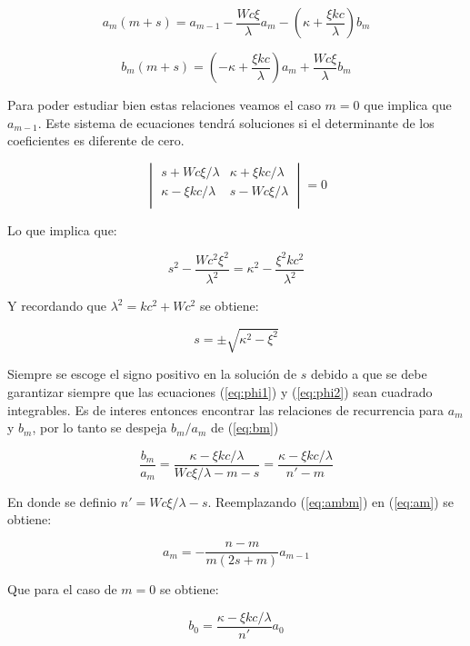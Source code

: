 \documentclass[a4paper, 12pt]{article} %
\begin{document}
\begin{equation}\label{eq:am}
a_m(m+s) = a_{m-1} - \dfrac{Wc\xi}{\lambda}a_m - \left(\kappa + \dfrac{\xi kc}{\lambda}\right) b_m
\end{equation}

\begin{equation}\label{eq:bm}
b_m(m+s) = \left( -\kappa + \dfrac{\xi kc}{\lambda}  \right)a_m + \dfrac{Wc \xi}{\lambda}b_m
\end{equation}

Para poder estudiar bien estas relaciones veamos el caso $m=0$ que implica que $a_{m-1}$. Este 
sistema de ecuaciones tendr\'a soluciones si el determinante de los coeficientes es diferente de
cero. 

\[
\begin{vmatrix}
s + Wc \xi/\lambda & \kappa + \xi kc/\lambda \\
\kappa - \xi kc/\lambda & s-Wc \xi/\lambda \\
\end{vmatrix}
= 0
\]

Lo que implica que:

\[
s^2 - \dfrac{Wc^2 \xi^2}{\lambda^2} = \kappa^2 - \dfrac{\xi^2 kc^2}{\lambda^2}
\]

Y recordando que $\lambda^2 = kc^2 + Wc^2$ se obtiene:

\[
s = \pm \sqrt{\kappa^2 - \xi^2}
\]

Siempre se escoge el signo positivo en la soluci\'on de $s$ debido a que se debe garantizar siempre
que las ecuaciones (\ref{eq:phi1})  y (\ref{eq:phi2}) sean cuadrado integrables. Es de interes entonces
encontrar las relaciones de recurrencia para $a_m$ y $b_m$, por lo tanto se despeja $b_m/a_m$ de (\ref{eq:bm})

\begin{equation}\label{eq:ambm}
\dfrac{b_m}{a_m} = \dfrac{\kappa - \xi kc/\lambda}{Wc\xi /\lambda - m - s} = \dfrac{\kappa - \xi kc/\lambda}{n'-m}
\end{equation} 

En donde se definio $n' = Wc \xi /\lambda - s$. Reemplazando (\ref{eq:ambm}) en (\ref{eq:am}) se obtiene:

\begin{equation}\label{eq:am-1}
a_m = - \dfrac{n-m}{m(2s+m)}a_{m-1}
\end{equation} 

Que para el caso de $m=0$ se obtiene:

\begin{equation}
b_0 = \dfrac{\kappa - \xi kc/\lambda}{n'}a_0
\end{equation}
\end{document}
